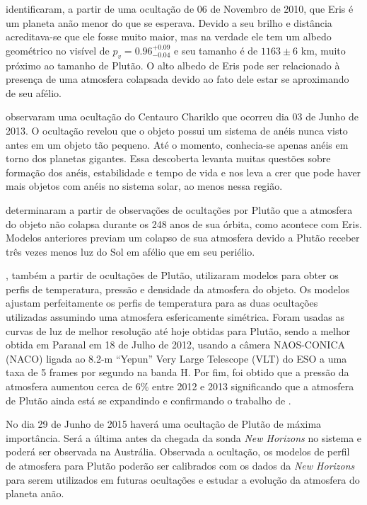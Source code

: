 \documentclass[12pt,a4paper]{monografia}
\begin{document}
\cite{Sicardy2011} identificaram, a partir de uma ocultação de 06 de Novembro de 2010, que Eris é um planeta anão menor do que se esperava. Devido a seu brilho e distância acreditava-se que ele fosse muito maior, mas na verdade ele tem um albedo geométrico no visível de $p_v=0.96^{+0.09}_{-0.04}$ e seu tamanho é de $1163 \pm 6$ km, muito próximo ao tamanho de Plutão. O alto albedo de Eris pode ser relacionado à presença de uma atmosfera colapsada devido ao fato dele estar se aproximando de seu afélio.

\cite{BragaRibas2014} observaram uma ocultação do Centauro Chariklo que ocorreu dia 03 de Junho de 2013. O ocultação revelou que o objeto possui um sistema de anéis nunca visto antes em um objeto tão pequeno. Até o momento, conhecia-se apenas anéis em torno dos planetas gigantes. Essa descoberta levanta muitas questões sobre formação dos anéis, estabilidade e tempo de vida e nos leva a crer que pode haver mais objetos com anéis no sistema solar, ao menos nessa região.

\cite{Olkin2015} determinaram a partir de observações de ocultações por Plutão que a atmosfera do objeto não colapsa durante os 248 anos de sua órbita, como acontece com Eris. Modelos anteriores previam um colapso de sua atmosfera devido a Plutão receber três vezes menos luz do Sol em afélio que em seu periélio.

\cite{DiasOliveira2015}, também a partir de ocultações de Plutão, utilizaram modelos para obter os perfis de temperatura, pressão e densidade da atmosfera do objeto. Os modelos ajustam perfeitamente os perfis de temperatura para as duas ocultações utilizadas assumindo uma atmosfera esfericamente simétrica. Foram usadas as curvas de luz de melhor resolução até hoje obtidas para Plutão, sendo a melhor obtida em  Paranal em 18 de Julho de 2012, usando a câmera NAOS-CONICA (NACO) ligada ao 8.2-m “Yepun” Very Large Telescope (VLT) do ESO a uma taxa de 5 frames por segundo na banda H. Por fim, foi obtido que a pressão da atmosfera aumentou cerca de 6\% entre 2012 e 2013 significando que a atmosfera de Plutão ainda está se expandindo e confirmando o trabalho de \cite{Olkin2015}.

No dia 29 de Junho de 2015 haverá uma ocultação de Plutão de máxima importância. Será a última antes da chegada da sonda \textit{New Horizons} no sistema e poderá ser observada na Austrália. Observada a ocultação, os modelos de perfil de atmosfera para Plutão poderão ser calibrados com os dados da \textit{New Horizons} para serem utilizados em futuras ocultações e estudar a evolução da atmosfera do planeta anão.
\end{document}
